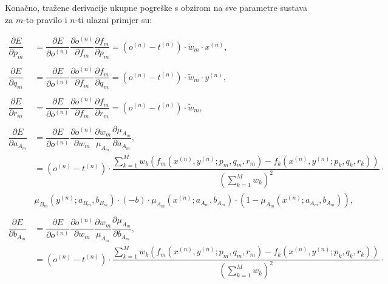 \documentclass[12pt, a4paper]{article}
\begin{document}
Konačno, tražene derivacije ukupne pogreške s obzirom na sve parametre sustava za $m$-to pravilo i $n$-ti ulazni primjer su:

\begin{align*}
  \dfrac{\partial E}{\partial p_m} &= 
    \dfrac{\partial E}{\partial o^{(n)}} 
    \dfrac{\partial o^{(n)}}{\partial f_m}
    \dfrac{\partial f_m}{\partial p_m} =
    \left( o^{(n)} - t^{(n)} \right) \cdot
    \widetilde{w}_m \cdot x^{(n)}, \\ \\
  \dfrac{\partial E}{\partial q_m} &= 
    \dfrac{\partial E}{\partial o^{(n)}} 
    \dfrac{\partial o^{(n)}}{\partial f_m}
    \dfrac{\partial f_m}{\partial q_m} =
    \left( o^{(n)} - t^{(n)} \right) \cdot
    \widetilde{w}_m \cdot y^{(n)}, \\ \\
  \dfrac{\partial E}{\partial r_m} &= 
    \dfrac{\partial E}{\partial o^{(n)}} 
    \dfrac{\partial o^{(n)}}{\partial f_m}
    \dfrac{\partial f_m}{\partial r_m} =
    \left( o^{(n)} - t^{(n)} \right) \cdot
    \widetilde{w}_m, \\ \\
  \dfrac{\partial E}{\partial a_{A_m}} &=
    \dfrac{\partial E}{\partial o^{(n)}} 
    \dfrac{\partial o^{(n)}}{\partial w_m}
    \dfrac{\partial w_m}{\mu_{A_m}}
    \dfrac{\partial \mu_{A_m}}{\partial a_{A_m}}, \\ &=
    \left( o^{(n)} - t^{(n)} \right) \cdot
    \dfrac{
      \sum_{k=1}^{M} w_k
      \left( f_m \left( x^{(n)}, y^{(n)}; p_m, q_m, r_m \right)
      - f_k \left( x^{(n)}, y^{(n)}; p_k, q_k, r_k \right)\right)}
    {\left( \sum_{k=1}^{M} w_k \right)^2} \cdot \\ &
    \mu_{B_m} \left( y^{(n)}; a_{B_m}, b_{B_m} \right) \cdot
    (-b) \cdot \mu_{A_m} \left( x^{(n)}; a_{A_m}, b_{A_m} \right) \cdot \left( 1 - \mu_{A_m} \left( x^{(n)}; a_{A_m}, b_{A_m} \right) \right), \\ \\
  \dfrac{\partial E}{\partial b_{A_m}} &= 
    \dfrac{\partial E}{\partial o^{(n)}} 
    \dfrac{\partial o^{(n)}}{\partial w_m}
    \dfrac{\partial w_m}{\mu_{A_m}}
    \dfrac{\partial \mu_{A_m}}{\partial b_{A_m}}, \\ &= 
    \left( o^{(n)} - t^{(n)} \right) \cdot
    \dfrac{
      \sum_{k=1}^{M} w_k
      \left( f_m \left( x^{(n)}, y^{(n)}; p_m, q_m, r_m \right)
      - f_k \left( x^{(n)}, y^{(n)}; p_k, q_k, r_k \right)\right)}
    {\left( \sum_{k=1}^{M} w_k \right)^2} \cdot \\ &

\end{align*}
\end{document}
